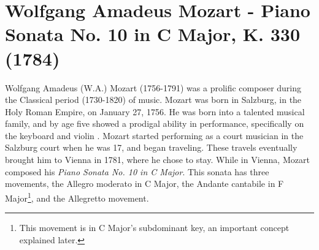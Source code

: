 \chapter[Mozart's Piano Sonata No. 10 in C Major, K. 330]{Wolfgang Amadeus Mozart - Piano Sonata No. 10 in C Major, K. 330 (1784)}
Wolfgang Amadeus (W.A.) Mozart (1756-1791) was a prolific composer during the Classical period (1730-1820) of music. Mozart was born in Salzburg, in the Holy Roman Empire, on January 27, 1756\autocite{Burkholder_Grout_Palisca_2014}. He was born into a talented musical family, and by age five showed a prodigal ability in performance, specifically on the keyboard and violin \autocite{Eisen_Sadie_2001}. Mozart started performing as a court musician in the Salzburg court when he was 17, and began traveling. These travels eventually brought him to Vienna in 1781, where he chose to stay. While in Vienna, Mozart composed his \textit{Piano Sonata No. 10 in C Major}. This sonata has three movements, the Allegro moderato in C Major, the Andante cantabile in F Major\footnote{This movement is in C Major's subdominant key, an important concept explained later.}, and the Allegretto movement. 

